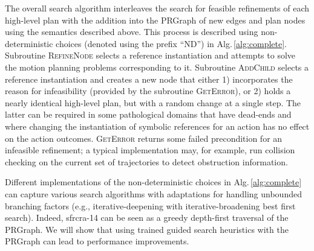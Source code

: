 The overall search algorithm interleaves the search for feasible
refinements of each high-level plan with the addition into the
{\sc PRGraph} of new edges and plan nodes using the semantics described
above. This process is described using non-deterministic choices
(denoted using the prefix ``ND'') in
Alg.\,\ref{alg:complete}. Subroutine \textsc{RefineNode} selects a
reference instantiation and attempts to solve the motion planning
problems corresponding to it. Subroutine \textsc{AddChild} selects a
reference instantiation and creates a new node that either 1)
incorporates the reason for infeasibility (provided by the
subroutine \textsc{GetError}), or 2) holds a nearly identical high-level plan,
but with a random change at a single step.
The latter can be required in some
pathological domains that have dead-ends and where changing the
instantiation of symbolic references for an action has no effect on the
action outcomes. \textsc{GetError} returns some failed precondition
for an infeasible refinement; a typical implementation may, for example, run collision
checking on the current set of trajectories to detect obstruction information.

Different implementations of the non-deterministic choices in
Alg.\,\ref{alg:complete} can capture various search algorithms
with adaptations for handling unbounded branching factors (e.g.,
iterative-deepening with iterative-broadening best first
search). Indeed, {\sc sfrcra-14} can be seen as a greedy depth-first traversal of the
{\sc PRGraph}. We will show that using trained guided search heuristics with the
{\sc PRGraph} can lead to performance improvements.

